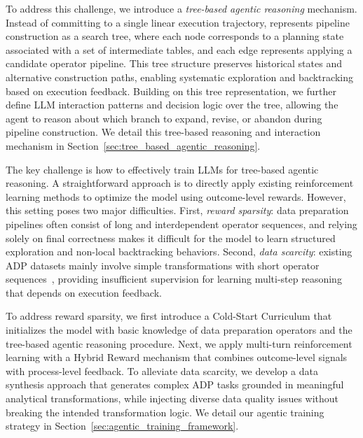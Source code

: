 To address this challenge, we introduce a \emph{tree-based agentic reasoning} mechanism. Instead of committing to a single linear execution trajectory, \sys represents pipeline construction as a search tree, where each node corresponds to a planning state associated with a set of intermediate tables, and each edge represents applying a candidate operator pipeline. This tree structure preserves historical states and alternative construction paths, enabling systematic exploration and backtracking based on execution feedback.
Building on this tree representation, we further define LLM interaction patterns and decision logic over the tree, allowing the agent to reason about which branch to expand, revise, or abandon during pipeline construction. We detail this tree-based reasoning and interaction mechanism in Section~\ref{sec:tree_based_agentic_reasoning}.

The key challenge is how to effectively train LLMs for tree-based agentic reasoning.
A straightforward approach is to directly apply existing reinforcement learning methods to optimize the model using outcome-level rewards.
However, this setting poses two major difficulties.
First, \emph{reward sparsity}: data preparation pipelines often consist of long and interdependent operator sequences, and relying solely on final correctness makes it difficult for the model to learn structured exploration and non-local backtracking behaviors.
Second, \emph{data scarcity}: existing ADP datasets mainly involve simple transformations with short operator sequences~\cite{DBLP:journals/pvldb/LiHYWC23, lai2025auto}, providing insufficient supervision for learning multi-step reasoning that depends on execution feedback.

To address reward sparsity, we first introduce a Cold-Start Curriculum that initializes the model with basic knowledge of data preparation operators and the tree-based agentic reasoning procedure.
Next, we apply multi-turn reinforcement learning with a Hybrid Reward mechanism that combines outcome-level signals with process-level feedback.
To alleviate data scarcity, we develop a data synthesis approach that generates complex ADP tasks grounded in meaningful analytical transformations, while injecting diverse data quality issues without breaking the intended transformation logic.
We detail our agentic training strategy in Section~\ref{sec:agentic_training_framework}.

